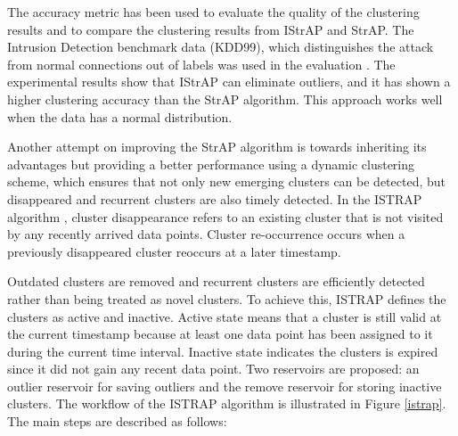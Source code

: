 
The accuracy metric has been used to evaluate the quality of the clustering results and to compare the clustering results from IStrAP and StrAP. The Intrusion Detection benchmark data (KDD99), which distinguishes the attack from normal connections out of labels was used in the evaluation \cite{li2012improved}. The experimental results show that IStrAP can eliminate outliers, and it has shown a higher clustering accuracy than the StrAP algorithm. This approach works well when the data has a normal distribution. %



Another attempt on improving the StrAP algorithm is towards inheriting its advantages but providing a better performance using a dynamic clustering scheme, which ensures that not only new emerging clusters can be detected, but disappeared and recurrent clusters are also timely detected. In the ISTRAP algorithm \cite{sui2018dynamic}, cluster disappearance refers to an existing cluster that is not visited by any recently arrived data points. Cluster re-occurrence occurs when a previously disappeared cluster reoccurs at a later timestamp. 

Outdated clusters are removed and recurrent clusters are efficiently detected rather than being treated as novel clusters. To achieve this, ISTRAP defines the clusters as active and inactive. Active state means that a cluster is still valid at the current timestamp because at least one data point has been assigned to it during the current time interval. Inactive state indicates the clusters is expired since it did not gain any recent data point. Two reservoirs are proposed: an outlier reservoir for saving outliers and the remove reservoir for storing inactive clusters. The workflow of the ISTRAP algorithm is illustrated in Figure \ref{istrap}. The main steps are described as follows:

